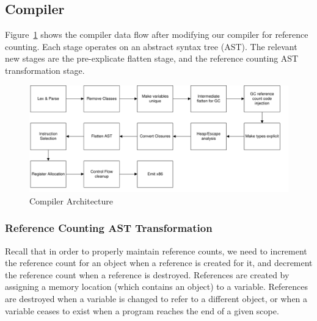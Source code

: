 \documentclass{sigplanconf}
\begin{document}
\subsection{Compiler}

Figure~\ref{fig-comparch} shows the compiler data flow after modifying our compiler for reference counting.  Each stage operates on an abstract syntax tree (AST).  The relevant new stages are the pre-explicate flatten stage, and the reference counting AST transformation stage.  

\begin{figure}
\begin{center}
\includegraphics[scale=0.48]{compiler_flow.pdf}
\end{center}
\caption{Compiler Architecture}
\label{fig-comparch}
\end{figure}

\subsubsection{Reference Counting AST Transformation}

Recall that in order to properly maintain reference counts, we need to increment the reference count for an object when a reference is created for it, and decrement the reference count when a reference is destroyed.  References are created by assigning a memory location (which contains an object) to a variable.  References are destroyed when a variable is changed to refer to a different object, or when a variable ceases to exist when a program reaches the end of a given scope.
\end{document}
